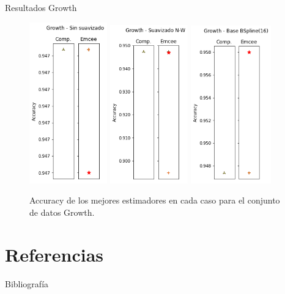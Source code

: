 \documentclass[10pt, professionalfonts]{beamer}
\begin{document}
\begin{frame}{Resultados Growth}
  \begin{figure}
    \includegraphics[width=0.3\textwidth]{img/results-new/clf_growth_none}\hfill
    \includegraphics[width=0.3\textwidth]{img/results-new/clf_growth_nw}\hfill
    \includegraphics[width=0.31\textwidth]{img/results-new/clf_growth_basis}
    \caption{Accuracy de los mejores estimadores en cada caso para el conjunto de datos Growth.}
  \end{figure}
\end{frame}

\section{Referencias}
\begin{frame}{Bibliografía}

\printbibliography[heading=none]

\end{frame}
\end{document}
